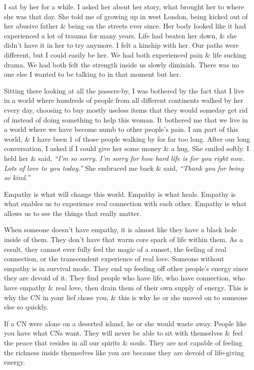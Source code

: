 \documentclass{article}
\numberwithin{equation}{section}
\begin{document}
I sat by her for a while. I asked her about her story, what brought her to where she was that day. She told me of growing up in west London, being kicked out of her abusive father \& being on the streets ever since. Her body looked like it had experienced a lot of trauma for many years. Life had beaten her down, \& she didn't have it in her to try anymore. I felt a kinship with her. Our paths were different, but I could easily be her. We had both experienced pain \& life sucking drama. We had both felt the strength inside us slowly diminish. There was no one else I wanted to be talking to in that moment but her.

Sitting there looking at all the passers-by, I was bothered by the fact that I live in a world where hundreds of people from all different continents walked by her every day, choosing to buy mostly useless items that they would someday get rid of instead of doing something to help this woman. It bothered me that we live in a world where we have become numb to other people's pain. I am part of this world, \& I have been 1 of those people walking by for far too long. After our long conversation, I asked if I could give her some money \& a hug. She smiled softly. I held her \& said, \textit{``I'm so sorry. I'm sorry for how hard life is for you right now. Lots of love to you today.''} She embraced me back \& said, \textit{``Thank you for being so kind.''}

Empathy is what will change this world. Empathy is what heals. Empathy is what enables us to experience real connection with each other. Empathy is what allows us to see the things that really matter.

When someone doesn't have empathy, it is almost like they have a black hole inside of them. They don't have that warm core spark of life within them. As a result, they cannot ever fully feel the magic of a sunset, the feeling of real connection, or the transcendent experience of real love. Someone without empathy is in survival mode. They end up feeding off other people's energy since they are devoid of it. They find people who have life, who have connection, who have empathy \& real love, then drain them of their own supply of energy. This is why the CN in your lief chose you, \& this is why he or she moved on to someone else so quickly.

If a CN were alone on a deserted island, he or she would waste away. People like you have what CNs want. They will never be able to sit with themselves \& feel the peace that resides in all our spirits \& souls. They are not capable of feeling the richness inside themselves like you are because they are devoid of life-giving energy.
\end{document}
